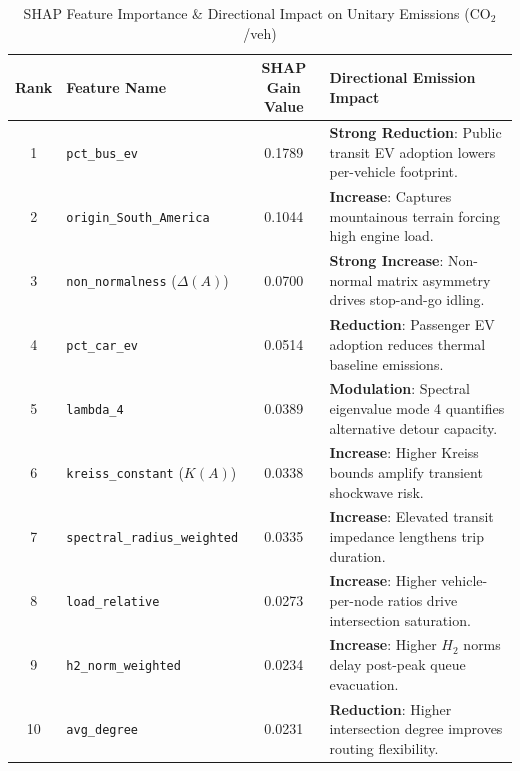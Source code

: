 \documentclass[lettersize,journal]{IEEEtran}
\begin{document}
\begin{table}[htbp]
\caption{SHAP Feature Importance \& Directional Impact on Unitary Emissions ($\text{CO}_2$/veh)}
\label{tab:shap}
\centering
\begin{tabular}{clcl}
\toprule
Rank & Feature Name & SHAP Gain Value & Directional Emission Impact \\
\midrule
1 & \texttt{pct\_bus\_ev} & 0.1789 & \textbf{Strong Reduction}: Public transit EV adoption lowers per-vehicle footprint. \\
2 & \texttt{origin\_South\_America} & 0.1044 & \textbf{Increase}: Captures mountainous terrain forcing high engine load. \\
3 & \texttt{non\_normalness} ($\Delta(A)$) & 0.0700 & \textbf{Strong Increase}: Non-normal matrix asymmetry drives stop-and-go idling. \\
4 & \texttt{pct\_car\_ev} & 0.0514 & \textbf{Reduction}: Passenger EV adoption reduces thermal baseline emissions. \\
5 & \texttt{lambda\_4} & 0.0389 & \textbf{Modulation}: Spectral eigenvalue mode 4 quantifies alternative detour capacity. \\
6 & \texttt{kreiss\_constant} ($K(A)$) & 0.0338 & \textbf{Increase}: Higher Kreiss bounds amplify transient shockwave risk. \\
7 & \texttt{spectral\_radius\_weighted} & 0.0335 & \textbf{Increase}: Elevated transit impedance lengthens trip duration. \\
8 & \texttt{load\_relative} & 0.0273 & \textbf{Increase}: Higher vehicle-per-node ratios drive intersection saturation. \\
9 & \texttt{h2\_norm\_weighted} & 0.0234 & \textbf{Increase}: Higher $H_2$ norms delay post-peak queue evacuation. \\
10 & \texttt{avg\_degree} & 0.0231 & \textbf{Reduction}: Higher intersection degree improves routing flexibility. \\
\bottomrule
\end{tabular}
\end{table}
\end{document}

